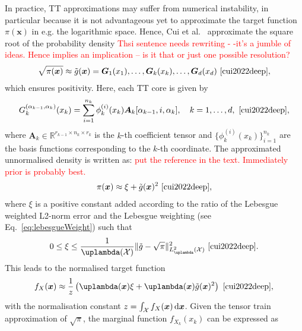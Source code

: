 In practice, TT approximations may suffer from numerical instability, in particular because it is not advantageous yet to approximate the target function $\pi(\bm{x})$ in e.g. the logarithmic space. 
Hence, Cui et al.~\cite{cui2022deep} approximate the square root of the probability density \textcolor{red}{Thsi sentence needs rewriting - -it's a jumble of ideas.
	Hence implies an implication -- is it that or just one possible resolution?}
\begin{align}
	\sqrt{\pi(\bm{x})} \approx \tilde{g}(\bm{x}) = \bm{G}_1(x_1), \dots, \bm{G}_k(x_k), \dots, \bm{G}_d(x_d)\, \,  \text{\cite[Eq. 18]{cui2022deep}},
\end{align}
which ensures positivity.
Here, each TT core is given by
\begin{equation}
	G^{(\alpha_{k-1},\alpha_k)}_k(x_k) = \sum_{i=1}^{n_k} \phi^{(i)}_k(x_k) \bm{A}_k[\alpha_{k-1}, i, \alpha_k], \quad k = 1, \dots, d,\, \,  \text{\cite[Eq. 21]{cui2022deep}},
\end{equation}
where $\bm{A}_k \in \mathbb{R}^{r_{k-1} \times n_k \times r_k}$ is the $k$-th coefficient tensor and $\{\phi^{(i)}_k(x_k)\}_{i=1}^{n_k}$ are the basis functions corresponding to the $k$-th coordinate.
The approximated unnormalised density is written as: \textcolor{red}{put the reference in the text. Immediately prior is probably best.}
\begin{align}
	\pi(\bm{x}) \approx \xi + \tilde{g}(\bm{x})^2\, \,  \text{\cite[Eq. 19]{cui2022deep}},
\end{align}
where $\xi$ is a positive constant added according to the ratio of the Lebesgue weighted L2-norm error and the Lebesgue weighting (see Eq.~\ref{eq:lebesgueWeight}) such that
\begin{align}
	0 \leq \xi \leq \frac{1}{\uplambda(\mathcal{X})} \lVert \tilde{g} - \sqrt{\pi} \rVert_{L^2_{\uplambda}(\mathcal{X})}^2\, \,  \text{\cite[Eq. 35]{cui2022deep}}. \label{eq:gamErr}
\end{align}
This leads to the normalised target function
\begin{align}
	f_X(\bm{x})  \approx \frac{1}{z} \left( \uplambda(\bm{x}) \xi  + \uplambda(\bm{x}) \tilde{g}(\bm{x})^2 \right)\, \,  \text{\cite[Eq. 19]{cui2022deep}},
\end{align}
with the normalisation constant $z = \int_{\mathcal{X}} f_X(\bm{x}) \mathop{}\!\mathrm{d} \bm{x} $.
Given the tensor train approximation of $\sqrt{\pi}$, the marginal function $f_{X_k}(x_k)$ can be expressed as
